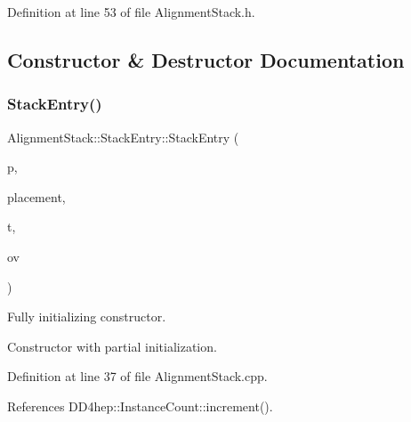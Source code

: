 Definition at line 53 of file Alignment\+Stack.\+h.



\subsection{Constructor \& Destructor Documentation}
\hypertarget{struct_d_d4hep_1_1_alignments_1_1_alignment_stack_1_1_stack_entry_ab70af826b6e4ccdfccf5b0ba45914fae}{}\label{struct_d_d4hep_1_1_alignments_1_1_alignment_stack_1_1_stack_entry_ab70af826b6e4ccdfccf5b0ba45914fae} 
\subsubsection{\texorpdfstring{Stack\+Entry()}{StackEntry()}\hspace{0.1cm}{\footnotesize\ttfamily [1/2]}}
{\footnotesize\ttfamily Alignment\+Stack\+::\+Stack\+Entry\+::\+Stack\+Entry (\begin{DoxyParamCaption}\item[{\hyperlink{class_d_d4hep_1_1_geometry_1_1_det_element}{Det\+Element}}]{p,  }\item[{const std\+::string \&}]{placement,  }\item[{const \hyperlink{class_d_d4hep_1_1_alignments_1_1_delta}{Delta} \&}]{t,  }\item[{double}]{ov }\end{DoxyParamCaption})}



Fully initializing constructor. 

Constructor with partial initialization. 

Definition at line 37 of file Alignment\+Stack.\+cpp.



References D\+D4hep\+::\+Instance\+Count\+::increment().

\hypertarget{struct_d_d4hep_1_1_alignments_1_1_alignment_stack_1_1_stack_entry_a9c332ece4923052e68db8d9ff9b2e72a}{}\label{struct_d_d4hep_1_1_alignments_1_1_alignment_stack_1_1_stack_entry_a9c332ece4923052e68db8d9ff9b2e72a} 
